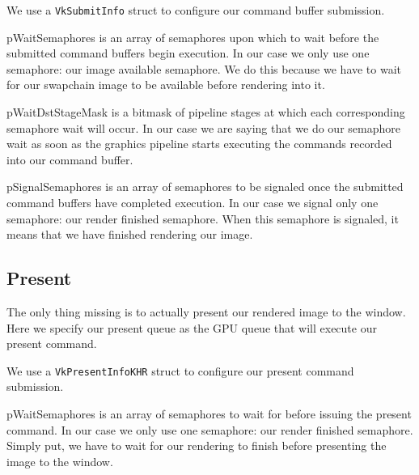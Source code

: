We use a \texttt{VkSubmitInfo} struct to configure our command buffer submission.

pWaitSemaphores is an array of semaphores upon which to wait before the submitted
command buffers begin execution.
In our case we only use one semaphore: our image available semaphore.
We do this because we have to wait for our swapchain image to be
available before rendering into it.

pWaitDstStageMask is a bitmask of pipeline stages at which each corresponding
semaphore wait will occur.
In our case we are saying that we do our semaphore wait as soon as the graphics
pipeline starts executing the commands recorded into our command buffer.

pSignalSemaphores is an array of semaphores to be signaled once the submitted command
buffers have completed execution.
In our case we signal only one semaphore: our render finished semaphore.
When this semaphore is signaled, it means that we have finished rendering our
image.

\begin{minipage}{\linewidth}{\noindent}
    
\end{minipage}

\subsection{Present}

The only thing missing is to actually present our rendered image to the window.
Here we specify our present queue as the GPU queue that will execute our present
command.

\begin{minipage}{\linewidth}{\noindent}
    
\end{minipage}

We use a \texttt{VkPresentInfoKHR} struct to configure our present command submission.

pWaitSemaphores is an array of semaphores to wait for before issuing the present
command.
In our case we only use one semaphore: our render finished semaphore.
Simply put, we have to wait for our rendering to finish before presenting
the image to the window.


